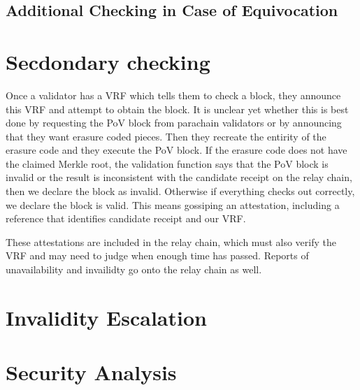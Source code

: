 \subsection{Additional Checking in Case of Equivocation}\label{equivocation-case}

\section{Secdondary checking}

Once a validator has a VRF which tells them to check a block, they announce this VRF and attempt to obtain the block. It is unclear yet whether this is best done by requesting the PoV block from parachain validators or by announcing that they want erasure coded pieces. Then they recreate the entirity of the erasure code and they execute the PoV block. If the erasure code does not have the claimed Merkle root, the validation function says that the PoV block is invalid or the result is inconsistent with the candidate receipt on the relay chain, then we declare the block as invalid. Otherwise if everything checks out correctly, we declare the block is valid. This means gossiping an attestation, including a reference that identifies candidate receipt and our VRF. 

These attestations are included in the relay chain, which must also verify the VRF and may need to judge when enough time has passed. Reports of unavailability and invailidty go onto the relay chain as well.

\section{Invalidity Escalation}\label{escalation}

\section{Security Analysis}

